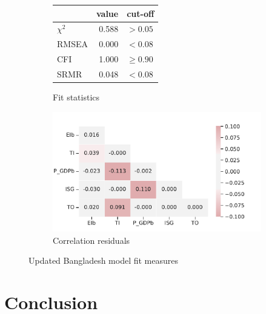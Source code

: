 \documentclass[11pt,a4paper]{article}
\begin{document}
\begin{figure}[tbp]
\begin{subfigure}{0.4\textwidth}
\centering
\begin{tabular}{lrl}
\toprule
{} &  value &      cut-off \\
\midrule
$\chi^2$ &  0.588 &     $> 0.05$ \\
RMSEA    &  0.000 &      $<0.08$ \\
CFI      &  1.000 &  $\geq 0.90$ \\
SRMR     &  0.048 &      $<0.08$ \\
\bottomrule
\end{tabular}
\caption{Fit statistics}
\label{tab:updated_fit_statistics}
\end{subfigure}
\begin{subfigure}{0.6\textwidth}
\centering
\includegraphics[width=\textwidth]{./plots/updated_correlation_residuals.pdf}
\caption{Correlation residuals}
\label{fig:updated_fit_residuals}
\end{subfigure}
\caption{Updated Bangladesh model fit measures}
\label{fig:updated_fit}
\end{figure}

\section{Conclusion}\label{sec:conclusion}
\end{document}
